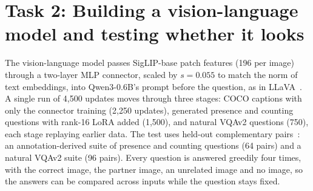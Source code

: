 \section{Task 2: Building a vision-language model and testing whether it looks}
\label{sec:task2}

The vision-language model passes SigLIP-base patch features (196 per image) through a two-layer MLP connector, scaled by $s=0.055$ to match the norm of text embeddings, into Qwen3-0.6B's prompt before the question, as in LLaVA~\citep{liu2023llava}. A single run of 4,500 updates moves through three stages: COCO captions with only the connector training (2,250 updates), generated presence and counting questions with rank-16 LoRA added (1,500), and natural VQAv2 questions (750), each stage replaying earlier data. The test uses held-out complementary pairs~\citep{goyal2017vqav2}: an annotation-derived suite of presence and counting questions (64 pairs) and a natural VQAv2 suite (96 pairs). Every question is answered greedily four times, with the correct image, the partner image, an unrelated image and no image, so the answers can be compared across inputs while the question stays fixed.

